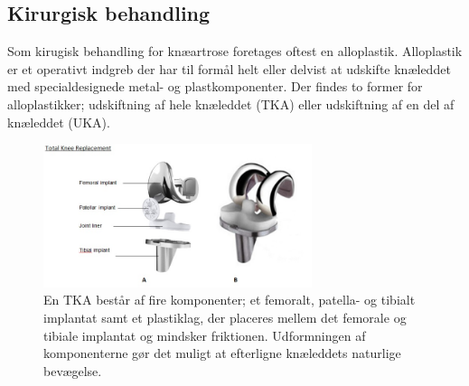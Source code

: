 %

\subsection{Kirurgisk behandling} \label{kirurgiskbehandling}
Som kirugisk behandling for knæartrose foretages oftest en alloplastik. Alloplastik er et operativt indgreb der har til formål helt eller delvist at udskifte knæleddet med specialdesignede metal- og plastkomponenter. Der findes to former for alloplastikker; udskiftning af hele knæleddet (TKA) eller udskiftning af en del af knæleddet (UKA). \citep{brostrom2012}

\begin{figure}[H] 
\begin{center}
\includegraphics[width=0.7\textwidth]{figures/tka_implant}
\end{center}
\caption{En TKA består af fire komponenter; et femoralt, patella- og tibialt implantat samt et plastiklag, der placeres mellem det femorale og tibiale implantat og mindsker friktionen. Udformningen af komponenterne gør det muligt at efterligne knæleddets naturlige bevægelse. \citep{robodoc2016}} 
\label{fig:tka_implant} 
\end{figure}

